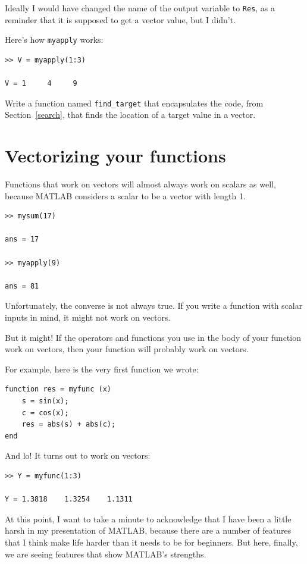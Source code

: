 \documentclass{book}
\begin{document}
Ideally I would have changed the name of the output variable to
{\tt Res}, as a reminder that it is supposed to get a vector value,
but I didn't.

Here's how {\tt myapply} works:

\begin{verbatim}
>> V = myapply(1:3)

V = 1     4     9
\end{verbatim}

\begin{ex}
Write a function named {\tt find\_target} that
encapsulates the code, from Section~\ref{search}, that finds the
location of a target value in a vector.
\end{ex}


\section{Vectorizing your functions}

Functions that work on vectors will almost always work on scalars
as well, because MATLAB considers a scalar to be a vector with
length 1.

\begin{verbatim}
>> mysum(17)

ans = 17

>> myapply(9)

ans = 81
\end{verbatim}

Unfortunately, the converse is not always true.  If you write
a function with scalar inputs in mind, it might not work on vectors.

But it might!  If the operators and functions
you use in the body of your function work on vectors, then your
function will probably work on vectors.

For example, here is the very first function we wrote:

\begin{verbatim}
function res = myfunc (x)
    s = sin(x);
    c = cos(x);
    res = abs(s) + abs(c);
end
\end{verbatim}

And lo!  It turns out to work on vectors:

\begin{verbatim}
>> Y = myfunc(1:3)

Y = 1.3818    1.3254    1.1311
\end{verbatim}

At this point, I want to take a minute to acknowledge that I
have been a little harsh in my presentation of MATLAB, because
there are a number of features that I think make life harder
than it needs to be for beginners.  But here, finally,
we are seeing features that show MATLAB's strengths.
\end{document}
